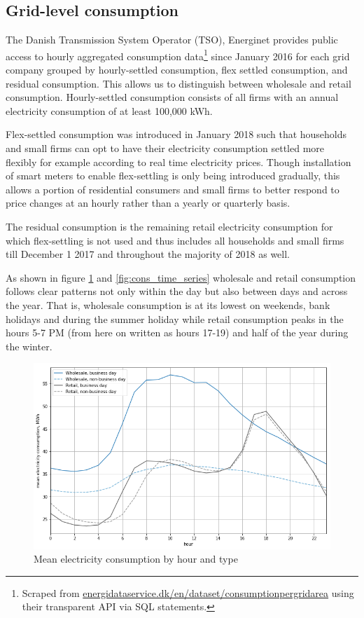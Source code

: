 \subsection{Grid-level consumption}
\label{subsec:d_consumption}
The Danish Transmission System Operator (TSO), Energinet provides public access to hourly aggregated consumption data\footnote{Scraped from \href{https://www.energidataservice.dk/en/dataset/consumptionpergridarea/}{energidataservice.dk/en/dataset/consumptionpergridarea} using their transparent API via SQL statements.} since January 2016 for each grid company grouped by hourly-settled consumption, flex settled consumption, and residual consumption. This allows us to distinguish between wholesale and retail consumption. Hourly-settled consumption consists of all firms with an annual electricity consumption of at least 100,000 kWh.
\par
Flex-settled consumption was introduced in January 2018 such that households and small firms can opt to have their electricity consumption settled more flexibly for example according to real time electricity prices. Though installation of smart meters to enable flex-settling is only being introduced gradually, this allows a portion of residential consumers and small firms to better respond to price changes at an hourly rather than a yearly or quarterly basis.
\par
The residual consumption is the remaining retail electricity consumption for which flex-settling is not used and thus includes all households and small firms till December 1 2017 and throughout the majority of 2018 as well.
\bigskip\par
As shown in figure \ref{fig:cons_hours} and \ref{fig:cons_time_series} wholesale and retail consumption follows clear patterns not only within the day but also between days and across the year. That is, wholesale consumption is at its lowest on weekends, bank holidays and during the summer holiday while retail consumption peaks in the hours 5-7 PM (from here on written as hours 17-19) and half of the year during the winter.
\begin{figure}[H]
  \centering
  \caption{Mean electricity consumption by hour and type}
    \label{fig:cons_hours}
  \includegraphics[width=1 \textwidth]{03_figures/cons_hours}
\end{figure}

